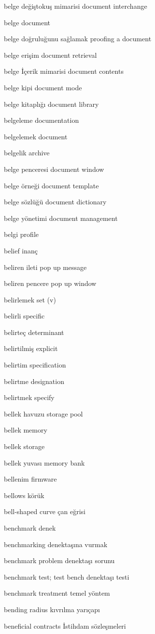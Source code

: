 \documentclass[12pt,fleqn]{article}\usepackage{../../common}
\begin{document}
belge değiştokuş mimarisi document interchange

belge document

belge doğruluğunu sağlamak proofing a document

belge erişim document retrieval

belge İçerik mimarisi document contents

belge kipi document mode

belge kitaplığı document library

belgeleme documentation

belgelemek document

belgelik archive

belge penceresi document window

belge örneği document template

belge sözlüğü document dictionary

belge yönetimi document management

belgi profile

belief inanç

beliren ileti pop up message

beliren pencere pop up window

belirlemek set (v)

belirli specific

belirteç determinant

belirtilmiş explicit

belirtim specification

belirtme designation

belirtmek specify

bellek havuzu storage pool

bellek memory

bellek storage

bellek yuvası memory bank

bellenim firmware

bellows körük

bell-shaped curve çan eğrisi

benchmark denek

benchmarking denektaşına vurmak

benchmark problem denektaşı sorunu

benchmark test; test bench denektaşı testi

benchmark treatment temel yöntem

bending radius kıvrılma yarıçapı

beneficial contracts İstihdam sözleşmeleri
\end{document}
